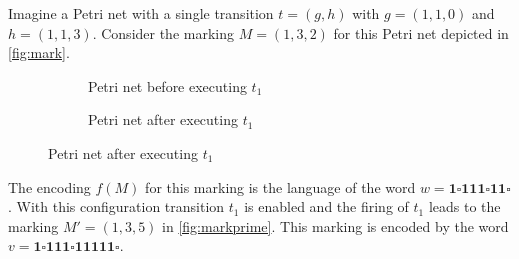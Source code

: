 Imagine a Petri net with a single transition $t=(g,h)$ with $g = (1,1,0)$ and $h = (1,1,3)$. Consider the marking $M=(1,3,2)$ for this Petri net depicted in \autoref{fig:mark}. 

\begin{figure}
\begin{minipage}{0.46\textwidth}
\begin{figure}[H]
\centering 
\caption{Petri net before executing $t_{1}$}\label{fig:mark}
\end{figure}
\end{minipage}
\hfill
\begin{minipage}{0.46\textwidth}
\begin{figure}[H]
\centering 
\caption{Petri net after executing $t_{1}$}\label{fig:markprime}
\end{figure}
\end{minipage}
\end{figure}

The encoding $f(M)$ for this marking is the language of the word $w = \bm{1 \square 111 \square 11 \square}$. With this configuration transition $t_{1}$ is enabled and the firing of $t_{1}$ leads to the marking $M'=(1,3,5)$ in \autoref{fig:markprime}. This marking is encoded by the word $v = \bm{1 \square 111 \square 11111 \square}$. 

